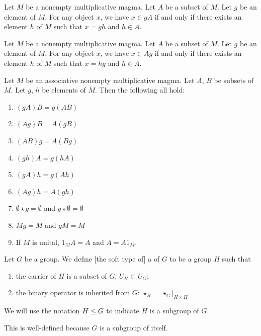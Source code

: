 \begin{theorem}
Let $M$ be a nonempty multiplicative magma.
Let $A$ be a subset of $M$.
Let $g$ be an element of $M$.
For any object $x$, we have $x\in gA$ if and only if there exists an
element $h$ of $M$ such that $x=gh$ and $h\in A$.
\end{theorem}

\begin{theorem}
Let $M$ be a nonempty multiplicative magma.
Let $A$ be a subset of $M$.
Let $g$ be an element of $M$.
For any object $x$, we have $x\in Ag$ if and only if there exists an
element $h$ of $M$ such that $x=hg$ and $h\in A$.
\end{theorem}

\begin{theorem}
Let $M$ be an associative nonempty multiplicative magma.
Let $A$, $B$ be subsets of $M$.
Let $g$, $h$ be elements of $M$. Then the following all hold:
\begin{enumerate}
\item $(gA)B=g(AB)$
\item $(Ag)B=A(gB)$
\item $(AB)g=A(Bg)$
\item $(gh)A=g(hA)$
\item $(gA)h=g(Ah)$
\item $(Ag)h=A(gh)$
\item $\emptyset\star g=\emptyset$ and $g\star\emptyset=\emptyset$
\item $Mg=M$ and $gM=M$
\item If $M$ is unital, $1_{M}A=A$ and $A=A1_{M}$.
\end{enumerate}
\end{theorem}

\begin{definition}[Subgroup]
Let $G$ be a group. We define [the soft type of] a 
of $G$ to be a group $H$ such that
\begin{enumerate}
\item the carrier of $H$ is a subset of $G$: $U_{H}\subset U_{G}$;
\item the binary operator is inherited from $G$:
  $\star_{H}=\star_{G}|_{H\times H}$.
\end{enumerate}
We will use the notation $H\leq G$ to indicate $H$ is a subgroup
of $G$.

This is well-defined because $G$ is a subgroup of itself.
\end{definition}

